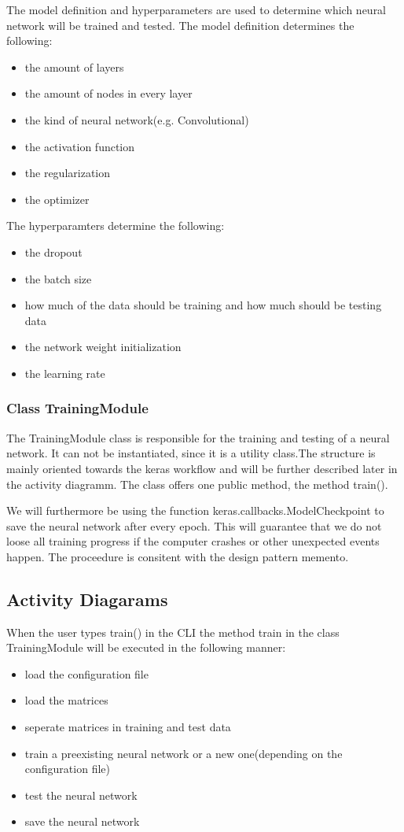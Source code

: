 \documentclass[parskip=full]{scrartcl}
\begin{document}
The model definition and hyperparameters are used to determine which neural network will be trained and tested. The model definition determines the following:
\begin{itemize}
\item the amount of layers
\item the amount of nodes in every layer
\item the kind of neural network(e.g. Convolutional)
\item the activation function
\item the regularization
\item the optimizer
\end{itemize}

The hyperparamters determine the following:

\begin{itemize}
\item the dropout
\item the batch size
\item how much of the data should be training and how much should be testing data
\item the network weight initialization
\item the learning rate
\end{itemize}

\subsubsection{Class TrainingModule}
The TrainingModule class is responsible for the training and testing of a neural network.
It can not be instantiated, since it is a utility class.The structure is mainly oriented towards the keras workflow and will be further described later in the activity diagramm.
The class offers one public method, the method train(). \newline

We will furthermore be using the function keras.callbacks.ModelCheckpoint to save the neural network after every epoch. This will guarantee that we do not loose all training progress if the computer crashes or other unexpected events happen. The proceedure is consitent with the design pattern \gls{memento}.


\subsection{Activity Diagarams}
When the user types train() in the CLI the method train in the class TrainingModule will be executed in the following manner:

\begin{itemize}
\item load the configuration file
\item load the matrices
\item seperate matrices in training and test data
\item train a preexisting neural network or a new one(depending on the configuration file)
\item test the neural network
\item save the neural network
\end{itemize}
\end{document}

